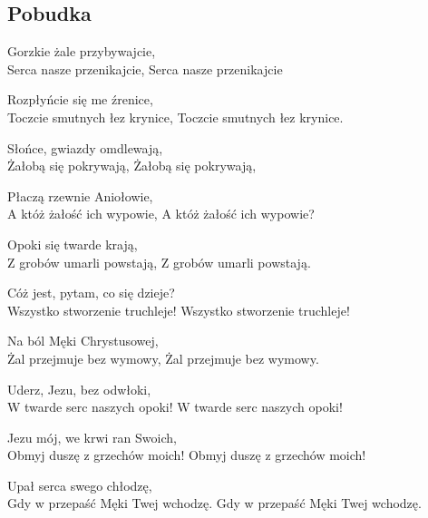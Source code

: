 
\subsection{Pobudka}

Gorzkie żale przybywajcie,\\ Serca nasze przenikajcie, Serca nasze przenikajcie

Rozpłyńcie się me źrenice,\\ 
Toczcie smutnych łez krynice, Toczcie smutnych łez krynice.

Słońce, gwiazdy omdlewają,\\ 
Żałobą się pokrywają, Żałobą się pokrywają, 

Płaczą rzewnie Aniołowie, \\ 
A któż żałość ich wypowie, A któż żałość ich wypowie?

Opoki się twarde krają,\\ 
Z grobów umarli powstają, Z grobów umarli powstają.

Cóż jest, pytam, co się dzieje?\\
Wszystko stworzenie truchleje! Wszystko stworzenie truchleje!

Na ból Męki Chrystusowej,\\ 
Żal przejmuje bez wymowy, Żal przejmuje bez wymowy.

Uderz, Jezu, bez odwłoki,\\
W twarde serc naszych opoki!  W twarde serc naszych opoki!

Jezu mój, we krwi ran Swoich,\\
Obmyj duszę z grzechów moich! Obmyj duszę z grzechów moich! 

Upał serca swego chłodzę,\\
Gdy w przepaść Męki Twej wchodzę.  Gdy w przepaść Męki Twej wchodzę.
